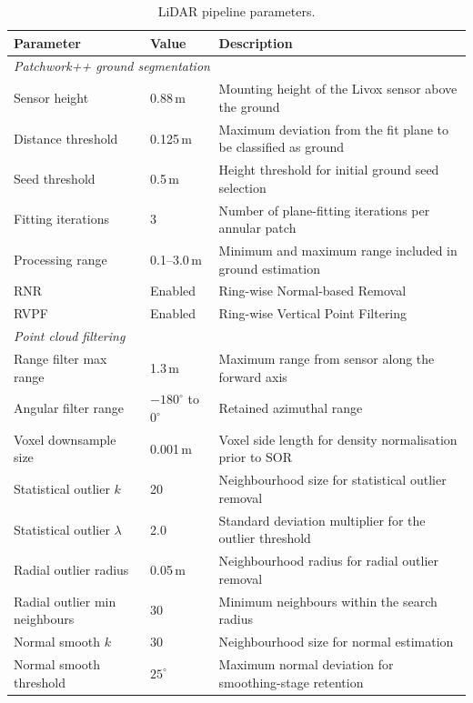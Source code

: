 \begin{table}[htbp]
  \centering
  \caption{LiDAR pipeline parameters.}
  \label{tab:pa-lidar-params}
  \begin{tabularx}{\textwidth}{l l X}
    \toprule
    \textbf{Parameter} & \textbf{Value} & \textbf{Description} \\
    \midrule
    \multicolumn{3}{l}{\textit{Patchwork++ ground segmentation}} \\
    \midrule
    Sensor height          & 0.88\,m        & Mounting height of the Livox sensor above the ground \\
    Distance threshold     & 0.125\,m       & Maximum deviation from the fit plane to be classified as ground \\
    Seed threshold         & 0.5\,m         & Height threshold for initial ground seed selection \\
    Fitting iterations     & 3              & Number of plane-fitting iterations per annular patch \\
    Processing range       & 0.1--3.0\,m    & Minimum and maximum range included in ground estimation \\
    RNR                    & Enabled        & Ring-wise Normal-based Removal \\
    RVPF                   & Enabled        & Ring-wise Vertical Point Filtering \\
    \midrule
    \multicolumn{3}{l}{\textit{Point cloud filtering}} \\
    \midrule
    Range filter max range              & 1.3\,m                    & Maximum range from sensor along the forward axis \\
    Angular filter range                & $-180^{\circ}$ to $0^{\circ}$ & Retained azimuthal range \\
    Voxel downsample size               & 0.001\,m                  & Voxel side length for density normalisation prior to SOR \\
    Statistical outlier $k$             & 20                        & Neighbourhood size for statistical outlier removal \\
    Statistical outlier $\lambda$       & 2.0                       & Standard deviation multiplier for the outlier threshold \\
    Radial outlier radius               & 0.05\,m                   & Neighbourhood radius for radial outlier removal \\
    Radial outlier min neighbours       & 30                        & Minimum neighbours within the search radius \\
    Normal smooth $k$                   & 30                        & Neighbourhood size for normal estimation \\
    Normal smooth threshold             & $25^{\circ}$              & Maximum normal deviation for smoothing-stage retention \\
    \bottomrule
  \end{tabularx}
\end{table}

